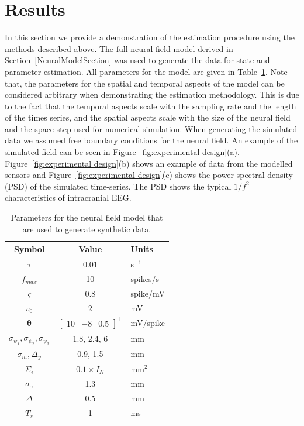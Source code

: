 \documentclass[10pt]{article}
\begin{document}
\section*{Results}\label{ResultsSection} In this section we provide a demonstration of the estimation procedure using the methods described above. The full neural field model derived in Section~\ref{NeuralModelSection} was used to generate the data for state and parameter estimation. All parameters for the model are given in Table~\ref{tab:Model Parameters}. Note that, the parameters for the spatial and temporal aspects of the model can be considered arbitrary when demonstrating the estimation methodology. This is due to the fact that the temporal aspects scale with the sampling rate and the length of the times series, and the spatial aspects scale with the size of the neural field and the space step used for numerical simulation. When generating the simulated data we assumed free boundary conditions for the neural field. An example of the simulated field can be seen in Figure~\ref{fig:experimental design}(a). Figure~\ref{fig:experimental design}(b) shows an example of data from the modelled sensors and Figure~\ref{fig:experimental design}(c) shows the power spectral density (PSD) of the simulated time-series. The PSD shows the typical $1/f^2$ characteristics of intracranial EEG.
\begin{table}\footnotesize
\centering
\begin{tabular}{ccl}
	\hline\hline Symbol & Value & Units \\
	\hline\hline
	$\tau$ & 0.01 & s$^{-1}$\\
	$f_{max}$ & 10 & spikes/s \\
	$\varsigma$ & 0.8 & spike/mV\\
	$v_0$ & 2 & mV\\
	$\boldsymbol{\theta}$ & $\left[\begin{array}{ccc}
	10 &-8 &0.5
	\end{array}
	\right]^{\top}$ & mV/spike\\
	$\sigma_{\psi_{1}}, \sigma_{\psi_{2}}, \sigma_{\psi_{3}}$ & 1.8, 2.4, 6 & mm\\
	$\sigma_{m},\Delta_{y}$&0.9, 1.5&mm\\
	$\Sigma_{\epsilon}$ &$0.1 \times I_{N} $& mm$^2$ \\
	$\sigma_{\gamma}$&1.3&mm\\
	$\Delta$ & 0.5 & mm \\
	$T_s$ & 1 & ms \\ 
\hline\hline
\end{tabular}
\caption{Parameters for the neural field model that are used to generate synthetic data.}
\label{tab:Model Parameters}
\end{table}
\end{document}
